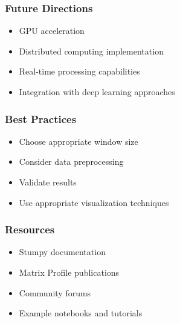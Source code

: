 \begin{frame}[fragile]\frametitle{Future Directions}
    \begin{itemize}
        \item GPU acceleration
        \item Distributed computing implementation
        \item Real-time processing capabilities
        \item Integration with deep learning approaches
    \end{itemize}
\end{frame}

\begin{frame}[fragile]\frametitle{Best Practices}
    \begin{itemize}
        \item Choose appropriate window size
        \item Consider data preprocessing
        \item Validate results
        \item Use appropriate visualization techniques
    \end{itemize}
\end{frame}

\begin{frame}[fragile]\frametitle{Resources}
    \begin{itemize}
        \item Stumpy documentation
        \item Matrix Profile publications
        \item Community forums
        \item Example notebooks and tutorials
    \end{itemize}
\end{frame}
